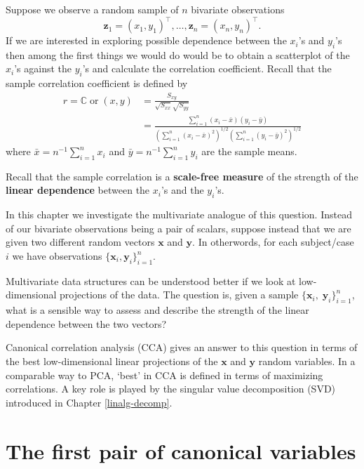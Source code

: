 \documentclass[]{book}
\theoremstyle{definition}
\theoremstyle{definition}
\theoremstyle{definition}
\theoremstyle{remark}
\begin{document}
Suppose we observe a random sample of \(n\) bivariate observations
\[
\mathbf z_1=(x_1,y_1)^\top , \ldots , \mathbf z_n=(x_n,y_n)^\top.
\]
If we are interested in exploring possible dependence between the \(x_i\)'s and \(y_i\)'s then among the first things we would do would be to obtain a scatterplot of the \(x_i\)'s against the \(y_i\)'s and calculate the correlation coefficient. Recall that the sample correlation coefficient is defined by
\begin{align}
r={\mathbb{C}\operatorname{or}}(x,y)&=\frac{S_{xy}}{\sqrt{S_{xx}}\sqrt{S_{yy}}}\\
&=\frac{\sum_{i=1}^n (x_i-\bar{x})(y_i-\bar{y})}{\left(\sum_{i=1}^n (x_i-\bar{x})^2  \right)^{1/2}  \left(\sum_{i=1}^n (y_i-\bar{y})^2 \right)^{1/2}}
\label{eq:scr}
\end{align}
where \(\bar{x}=n^{-1}\sum_{i=1}^n x_i\) and \(\bar{y}=n^{-1}\sum_{i=1}^n y_i\) are the sample means.

Recall that the sample correlation is a \textbf{scale-free measure} of the strength of the \textbf{linear dependence} between the \(x_i\)'s and the \(y_i\)'s.

In this chapter we investigate the multivariate analogue of this question. Instead of our bivariate observations being a pair of scalars, suppose instead that we are given two different random vectors \(\mathbf x\) and \(\mathbf y\). In otherwords, for each subject/case \(i\) we have observations
\(\{\mathbf x_i,\mathbf y_i\}_{i=1}^n.\)

Multivariate data structures can be understood better if we look at low-dimensional projections of the data. The question is, given a sample \(\{\mathbf x_i, \; \mathbf y_i\}_{i=1}^{n}\), what is a sensible way to assess and describe the strength of the linear dependence between the two vectors?

Canonical correlation analysis (CCA) gives an answer to this question in terms of the best low-dimensional linear projections of the \(\mathbf x\) and \(\mathbf y\) random variables. In a comparable way to PCA, `best' in CCA is defined in terms of maximizing correlations.
A key role is played by the singular value decomposition (SVD) introduced in Chapter \ref{linalg-decomp}.

\hypertarget{cca1}{%
\section{The first pair of canonical variables}\label{cca1}}
\end{document}
